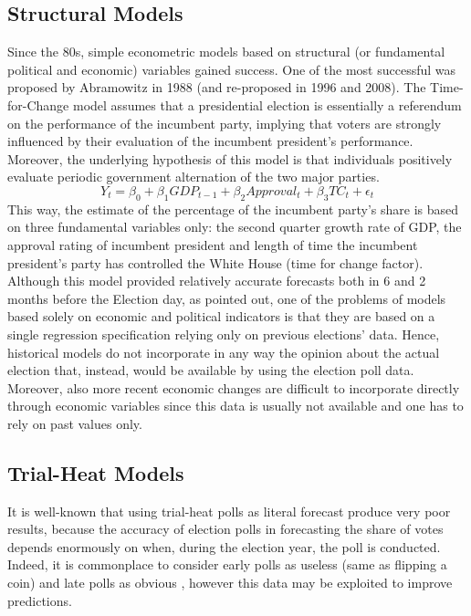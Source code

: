 \documentclass[
  12pt]{article}
\begin{document}
\hypertarget{structural-models}{%
\subsection{Structural Models}\label{structural-models}}

Since the 80s, simple econometric models based on structural (or
fundamental political and economic) variables gained success. One of the
most successful was proposed by Abramowitz in 1988 (and re-proposed in
1996 and 2008). The Time-for-Change model \citep{abr:2008} assumes that
a presidential election is essentially a referendum on the performance
of the incumbent party, implying that voters are strongly influenced by
their evaluation of the incumbent president's performance. Moreover, the
underlying hypothesis of this model is that individuals positively
evaluate periodic government alternation of the two major parties.
\[Y_t = \beta_0 + \beta_1 GDP_{t-1} + \beta_2 Approval_t + \beta_3 TC_t + \epsilon_t\]
This way, the estimate of the percentage of the incumbent party's share
is based on three fundamental variables only: the second quarter growth
rate of GDP, the approval rating of incumbent president and length of
time the incumbent president's party has controlled the White House
(time for change factor). Although this model provided relatively
accurate forecasts both in 6 and 2 months before the Election day, as
\citet{gel:kin:1993} pointed out, one of the problems of models based
solely on economic and political indicators is that they are based on a
single regression specification relying only on previous elections'
data. Hence, historical models do not incorporate in any way the opinion
about the actual election that, instead, would be available by using the
election poll data. Moreover, also more recent economic changes are
difficult to incorporate directly through economic variables since this
data is usually not available and one has to rely on past values only.

\hypertarget{trial-heat-models}{%
\subsection{Trial-Heat Models}\label{trial-heat-models}}

It is well-known that using trial-heat polls as literal forecast produce
very poor results, because the accuracy of election polls in forecasting
the share of votes depends enormously on when, during the election year,
the poll is conducted. Indeed, it is commonplace to consider early polls
as useless (same as flipping a coin) and late polls as obvious
\citep{cam:1996}, however this data may be exploited to improve
predictions.
\end{document}
